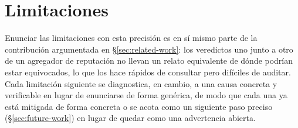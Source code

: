 \section{Limitaciones}
\label{sec:limitations}

Enunciar las limitaciones con esta precisi\'on es en s\'i mismo parte
de la contribuci\'on argumentada en \S\ref{sec:related-work}: los
veredictos uno junto a otro de un agregador de reputaci\'on no llevan
un relato equivalente de d\'onde podr\'ian estar equivocados, lo que
los hace r\'apidos de consultar pero dif\'iciles de auditar. Cada
limitaci\'on siguiente se diagnostica, en cambio, a una causa concreta
y verificable en lugar de enunciarse de forma gen\'erica, de modo que
cada una ya est\'a mitigada de forma concreta o se acota como un
siguiente paso preciso (\S\ref{sec:future-work}) en lugar de quedar
como una advertencia abierta.

